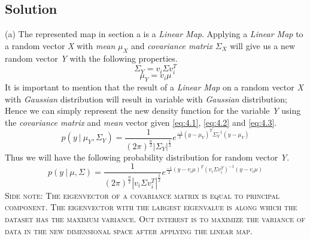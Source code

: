 \documentclass[12pt]{article}
\numberwithin{equation}{section}
\numberwithin{table}{section}
\numberwithin{figure}{section}
\begin{document}
\subsection*{Solution}
(a) The represented map in section a is a \textit{Linear Map}. Applying a \textit{Linear Map} to a random vector \textit{X} with \textit{mean} $\mu_X$ and \textit{covariance matrix} $\Sigma_X$ will give us a new random vector \textit{Y} with the following properties.
\begin{equation}\label{eq:4.2}
	\boxed{\Sigma_Y = v_i \Sigma v_i^T}
\end{equation}
\begin{equation}\label{eq:4.3}
\boxed{\mu_Y = v_i \mu}
\end{equation}
It is important to mention that the result of a \textit{Linear Map} on a random vector \textit{X} with \textit{Gaussian} distribution will result in variable  with \textit{Gaussian} distribution; Hence we can simply represent the new density function for the variable \textit{Y} using the \textit{covariance matrix} and \textit{mean} vector given \ref{eq:4.1}, \ref{eq:4.2} and \ref{eq:4.3}.
\begin{equation}\label{eq:4.4}
p(y\ |\ \mu_Y, \Sigma_Y) = \frac{1}{(2\pi)^\frac{n}{2}|\Sigma_Y|^\frac{1}{2}} e^{\frac{-1}{2}(y - \mu_Y)^T\Sigma_Y^{-1}(y - \mu_Y)} 
\end{equation}
Thus we will have the following probability distribution for random vector \textit{Y}.
$$
p(y\ |\ \mu, \Sigma) = \frac{1}{(2\pi)^\frac{n}{2}|v_i \Sigma v_i^T|^\frac{1}{2}} e^{\frac{-1}{2}(y - v_i \mu)^T(v_i \Sigma v_i^T)^{-1}(y - v_i \mu)}
$$
\textsc{Side note: The eigenvector of a covariance matrix is equal to principal component. The eigenvector with the largest eigenvalue is along which the dataset has the maximum variance. Out interest is to maximize the variance of data in the new dimensional space after applying the linear map.}
\end{document}
